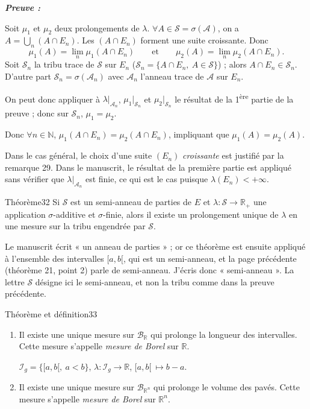 \documentclass[11pt,a4paper]{article}
\newcommand{\R}{\mathbb{R}}
\newcommand{\N}{\mathbb{N}}
\newcommand{\A}{\mathscr{A}}
\newcommand{\B}{\mathscr{B}}
\newcommand{\Ss}{\mathscr{S}}
\newcommand{\Ii}{\mathscr{I}}
\newenvironment{preuve}{\par\textit{\textbf{Preuve :}}\par\nopagebreak[4]}{\par}
\begin{document}
\begin{preuve}
Soit $\mu_1$ et $\mu_2$ deux prolongements de $\lambda$. $\forall A\in\Ss=\sigma(\A)$, on a $A=\bigcup_n(A\cap E_n)$.
Les $(A\cap E_n)$ forment une suite croissante. Donc
\[
  \mu_1(A)=\lim_{n}\mu_1(A\cap E_n)\qquad\text{et}\qquad\mu_2(A)=\lim_{n}\mu_2(A\cap E_n).
\]
Soit $\Ss_n$ la tribu trace de $\Ss$ sur $E_n$ ($\Ss_n=\{A\cap E_n,\ A\in\Ss\}$) ; alors $A\cap E_n\in\Ss_n$.
D'autre part $\Ss_n=\sigma(\A_n)$ avec $\A_n$ l'anneau trace de $\A$ sur $E_n$.

On peut donc appliquer à $\lambda|_{\A_n}$, $\mu_1|_{\Ss_n}$ et $\mu_2|_{\Ss_n}$ le résultat de la 1\textsuperscript{ère} partie de la preuve ; donc sur $\Ss_n$, $\mu_1=\mu_2$.

Donc $\forall n\in\N$, $\mu_1(A\cap E_n)=\mu_2(A\cap E_n)$, impliquant que $\mu_1(A)=\mu_2(A)$.
\end{preuve}

\begin{note}
Dans le cas général, le choix d'une suite $(E_n)$ \emph{croissante} est justifié par la remarque 29.
Dans le manuscrit, le résultat de la première partie est appliqué sans vérifier que $\lambda|_{\A_n}$ est finie, ce qui est le cas puisque $\lambda(E_n)<+\infty$.
\end{note}

\begin{enonce}{Théorème}{32}
Si $\Ss$ est un semi-anneau de parties de $E$ et $\lambda:\Ss\to\R_+$ une application $\sigma$-additive et $\sigma$-finie,
alors il existe un prolongement unique de $\lambda$ en une mesure sur la tribu engendrée par $\Ss$.
\end{enonce}

\begin{note}
Le manuscrit écrit « un anneau de parties » ; or ce théorème est ensuite appliqué à l'ensemble des intervalles $[a,b[$, qui est un semi-anneau, et la page précédente
(théorème 21, point 2) parle de semi-anneau. J'écris donc « semi-anneau ». La lettre $\Ss$ désigne ici le semi-anneau, et non la tribu comme dans la preuve précédente.
\end{note}

\begin{enonce}{Théorème et définition}{33}
\begin{enumerate}[label=\textbf{\arabic*-},leftmargin=1.2cm]
  \item Il existe une unique mesure sur $\B_{\R}$ qui prolonge la longueur des intervalles. Cette mesure s'appelle \emph{mesure de Borel} sur $\R$.

        $\Ii_g=\{[a,b[,\ a<b\}$, $\lambda:\Ii_g\to\R$, $[a,b[\ \longmapsto b-a$.
  \item Il existe une unique mesure sur $\B_{\R^n}$ qui prolonge le volume des pavés. Cette mesure s'appelle \emph{mesure de Borel} sur $\R^n$.
\end{enumerate}
\end{enonce}
\end{document}
